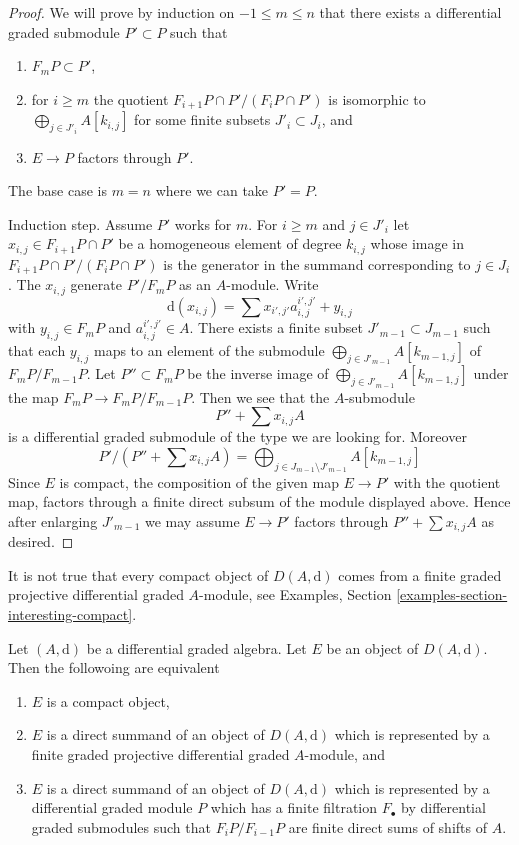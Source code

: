 \begin{proof}
We will prove by induction on $-1 \leq m \leq n$ that there exists
a differential graded submodule $P' \subset P$  such that
\begin{enumerate}
\item $F_mP \subset P'$,
\item for $i \geq m$ the quotient $F_{i + 1}P \cap P'/(F_iP \cap P')$ is
isomorphic to $\bigoplus_{j \in J'_i} A[k_{i, j}]$ for some finite subsets
$J'_i \subset J_i$, and
\item $E \to P$ factors through $P'$.
\end{enumerate}
The base case is $m = n$ where we can take $P' = P$.

\medskip\noindent
Induction step. Assume $P'$ works for $m$.
For $i \geq m$ and $j \in J'_i$ let $x_{i, j} \in F_{i + 1}P \cap P'$
be a homogeneous element of degree $k_{i, j}$ whose image in
$F_{i + 1}P \cap P'/(F_iP \cap P')$ is the generator in
the summand corresponding to $j \in J_i$. The
$x_{i, j}$ generate $P'/F_mP$ as an $A$-module. Write
$$
\text{d}(x_{i, j}) = \sum x_{i', j'} a_{i, j}^{i', j'} + y_{i, j}
$$
with $y_{i, j} \in F_mP$ and $a_{i, j}^{i', j'} \in A$.
There exists a finite subset
$J'_{m - 1} \subset J_{m - 1}$ such that each $y_{i, j}$ maps to
an element of the submodule $\bigoplus_{j \in J'_{m - 1}} A[k_{m - 1, j}]$
of $F_mP/F_{m - 1}P$. Let $P'' \subset F_mP$ be the inverse
image of $\bigoplus_{j \in J'_{m - 1}} A[k_{m - 1, j}]$ under
the map $F_mP \to F_mP/F_{m - 1}P$. Then we see that the $A$-submodule
$$
P'' + \sum x_{i, j}A
$$
is a differential graded submodule of the type we are looking for. Moreover
$$
P'/(P'' + \sum x_{i, j}A) =
\bigoplus\nolimits_{j \in J_{m - 1} \setminus J'_{m - 1}} A[k_{m - 1, j}]
$$
Since $E$ is compact, the composition of the given map $E \to P'$
with the quotient map, factors through a finite direct subsum of
the module displayed above. Hence after enlarging $J'_{m - 1}$
we may assume $E \to P'$ factors through
$P'' + \sum x_{i, j}A$ as desired.
\end{proof}

\noindent
It is not true that every compact object of $D(A, \text{d})$ comes
from a finite graded projective differential graded $A$-module,
see Examples, Section \ref{examples-section-interesting-compact}.

\begin{proposition}
\label{proposition-compact}
Let $(A, \text{d})$ be a differential graded algebra. Let $E$ be an
object of $D(A, \text{d})$. Then the followoing are equivalent
\begin{enumerate}
\item $E$ is a compact object,
\item $E$ is a direct summand of an object of $D(A, \text{d})$
which is represented by a finite graded projective differential graded
$A$-module, and
\item $E$ is a direct summand of an object of $D(A, \text{d})$
which is represented by a differential graded module $P$ which
has a finite filtration $F_\bullet$ by differential graded submodules
such that $F_iP/F_{i - 1}P$ are finite direct sums of shifts of $A$.
\end{enumerate}
\end{proposition}


